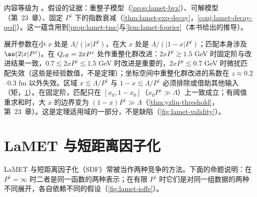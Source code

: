 内容等级为 \tagC。假设的证据：重整子模型（\cref{prop:lamet-bvz}）、可解模型（第~23~章）、固定 $P^z$ 下的指数衰减（\cref{thm:lamet-exp-decay}，\cref{conj:lamet-decay-qcd}）。这一蕴含用到\cref{prop:lamet-tmc}与\cref{lem:lamet-fourier}（本书给出的推导）。

\begin{remark}\label{rem:lamet-domain}
展开参数在小 $x$ 处是 $\Lambda/(|x|P^z)$，在大 $x$ 处是 $\Lambda/(|1-x|P^z)$；匹配本身涉及 $\as(2|x|P^z)$。在 $Q_{\rm eff}=2xP^z$ 处作重整化群改进\cite{Su:2022fiu}：$2xP^z\gtrsim1.5$ GeV 时固定阶与改进结果一致，$0.7\lesssim2xP^z\lesssim1.5$ GeV 时改进是重要的，$2xP^z\lesssim0.7$ GeV 时微扰匹配失效（这些是经验数值，不是定理）；坐标空间中重整化群改进的系数在 $z\approx0.2$--$0.3$ fm 以外失效。区域 $x\lesssim\Lambda/P^z$ 与 $1-x\lesssim\Lambda/P^z$ 必须排除或借助其他输入（矩，\cref{sec:lamet-sdf}）。在固定阶，匹配只在 $[x_0,1-x_0]$（$x_0P^z\gg\Lambda$）上一致成立；有阈值重求和时，大 $x$ 的边界变为 $(1-x)P^z\gg\Lambda$（\cref{thm:yzliu-threshold}，第~23~章）。这是定理适用域的一部分，不是缺陷（\cref{fig:lamet-validity}）。
\end{remark}

\section{LaMET 与短距离因子化}\label{sec:lamet-sdf}

LaMET 与短距离因子化（SDF）常被当作两种竞争的方法。下面的命题说明：在 $P^z=\infty$ 时二者是同一函数的两种表示；在有限 $P^z$ 时它们是对同一组数据的两种不同展开，各自依赖不同的假设（\cref{fig:lamet-ioffe}）。

